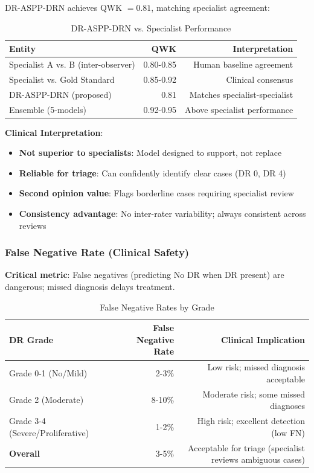 \documentclass[12pt,a4paper]{article}
\begin{document}
DR-ASPP-DRN achieves QWK $= 0.81$, matching specialist agreement:

\begin{table}[H]
\centering
\small
\caption{DR-ASPP-DRN vs. Specialist Performance}
\begin{tabular}{|l|r|r|}
\hline
\textbf{Entity} & \textbf{QWK} & \textbf{Interpretation} \\
\hline
Specialist A vs. B (inter-observer) & 0.80-0.85 & Human baseline agreement \\
Specialist vs. Gold Standard & 0.85-0.92 & Clinical consensus \\
DR-ASPP-DRN (proposed) & 0.81 & Matches specialist-specialist \\
Ensemble (5-models) & 0.92-0.95 & Above specialist performance \\
\hline
\end{tabular}
\end{table}

\textbf{Clinical Interpretation}:

\begin{itemize}
    \item \textbf{Not superior to specialists}: Model designed to support, not replace
    \item \textbf{Reliable for triage}: Can confidently identify clear cases (DR 0, DR 4)
    \item \textbf{Second opinion value}: Flags borderline cases requiring specialist review
    \item \textbf{Consistency advantage}: No inter-rater variability; always consistent across reviews
\end{itemize}

\subsubsection{False Negative Rate (Clinical Safety)}

\textbf{Critical metric}: False negatives (predicting No DR when DR present) are dangerous; missed diagnosis delays treatment.

\begin{table}[H]
\centering
\small
\caption{False Negative Rates by Grade}
\begin{tabular}{|l|r|r|}
\hline
\textbf{DR Grade} & \textbf{False Negative Rate} & \textbf{Clinical Implication} \\
\hline
Grade 0-1 (No/Mild) & 2-3\% & Low risk; missed diagnosis acceptable \\
Grade 2 (Moderate) & 8-10\% & Moderate risk; some missed diagnoses \\
Grade 3-4 (Severe/Proliferative) & 1-2\% & High risk; excellent detection (low FN) \\
\hline
\textbf{Overall} & 3-5\% & Acceptable for triage (specialist reviews ambiguous cases) \\
\hline
\end{tabular}
\end{table}
\end{document}
